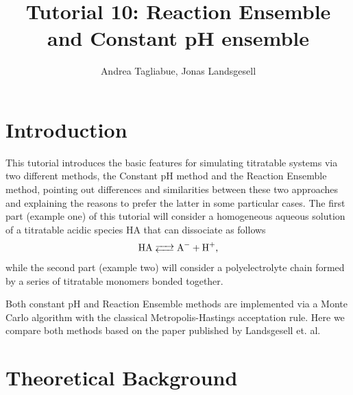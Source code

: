 \documentclass[
a4paper,                        %
11pt,                           %
twoside,                        %
footsepline,                    %
headsepline,                    %
headexclude,                    %
footexclude,                    %
pagesize,                       %
]{scrartcl}
\begin{document}
\title{Tutorial 10: Reaction Ensemble and Constant pH ensemble}
\author{Andrea Tagliabue, Jonas Landsgesell}

\maketitle
\tableofcontents

\section{Introduction}

This tutorial introduces the basic features for simulating titratable systems via two different methods, the Constant pH method and the Reaction Ensemble method, pointing out differences and similarities between these two approaches and explaining the reasons to prefer the latter in some particular cases.
The first part (example one) of this tutorial will consider a homogeneous aqueous solution of a titratable acidic species HA that can dissociate as follows
\begin{equation}\label{disso}
\ce{HA <--> A- + H+}\text{,}
\end{equation}
while the second part (example two) will consider a polyelectrolyte chain formed by a series of titratable monomers bonded together.

\noindent Both constant pH and Reaction Ensemble methods are implemented via a Monte Carlo algorithm with the classical Metropolis-Hastings acceptation rule. Here we compare both methods based on the paper published by Landsgesell et. al\cite{landsgesell2017simulation}.

\section{Theoretical Background}
\end{document}

